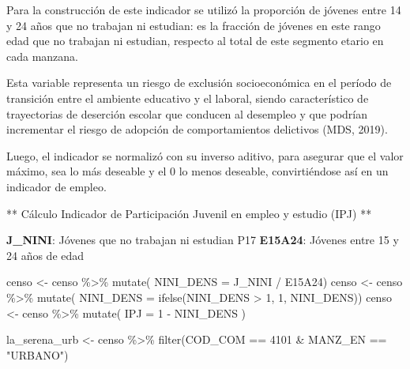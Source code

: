\documentclass[
  letterpaper,
  DIV=11,
  numbers=noendperiod]{scrreprt}
\newenvironment{Shaded}{\begin{snugshade}}{\end{snugshade}}
\newcommand{\AttributeTok}[1]{\textcolor[rgb]{0.40,0.45,0.13}{#1}}
\newcommand{\DecValTok}[1]{\textcolor[rgb]{0.68,0.00,0.00}{#1}}
\newcommand{\FunctionTok}[1]{\textcolor[rgb]{0.28,0.35,0.67}{#1}}
\newcommand{\NormalTok}[1]{\textcolor[rgb]{0.00,0.23,0.31}{#1}}
\newcommand{\OtherTok}[1]{\textcolor[rgb]{0.00,0.23,0.31}{#1}}
\newcommand{\SpecialCharTok}[1]{\textcolor[rgb]{0.37,0.37,0.37}{#1}}
\newcommand{\StringTok}[1]{\textcolor[rgb]{0.13,0.47,0.30}{#1}}
\begin{document}
Para la construcción de este indicador se utilizó la proporción de
jóvenes entre 14 y 24 años que no trabajan ni estudian: es la fracción
de jóvenes en este rango edad que no trabajan ni estudian, respecto al
total de este segmento etario en cada manzana.

Esta variable representa un riesgo de exclusión socioeconómica en el
período de transición entre el ambiente educativo y el laboral, siendo
característico de trayectorias de deserción escolar que conducen al
desempleo y que podrían incrementar el riesgo de adopción de
comportamientos delictivos (MDS, 2019).

Luego, el indicador se normalizó con su inverso aditivo, para asegurar
que el valor máximo, sea lo más deseable y el 0 lo menos deseable,
convirtiéndose así en un indicador de empleo.

** Cálculo Indicador de Participación Juvenil en empleo y estudio (IPJ)
**

\textbf{J\_NINI}: Jóvenes que no trabajan ni estudian P17
\textbf{E15A24}: Jóvenes entre 15 y 24 años de edad

\begin{Shaded}
\begin{Highlighting}[]
\NormalTok{censo }\OtherTok{\textless{}{-}}\NormalTok{ censo }\SpecialCharTok{\%\textgreater{}\%} \FunctionTok{mutate}\NormalTok{( }\AttributeTok{NINI\_DENS =}\NormalTok{ J\_NINI }\SpecialCharTok{/}\NormalTok{ E15A24)  }
\NormalTok{censo }\OtherTok{\textless{}{-}}\NormalTok{ censo }\SpecialCharTok{\%\textgreater{}\%} \FunctionTok{mutate}\NormalTok{( }\AttributeTok{NINI\_DENS =} \FunctionTok{ifelse}\NormalTok{(NINI\_DENS }\SpecialCharTok{\textgreater{}} \DecValTok{1}\NormalTok{, }\DecValTok{1}\NormalTok{, NINI\_DENS))  }
\NormalTok{censo }\OtherTok{\textless{}{-}}\NormalTok{ censo }\SpecialCharTok{\%\textgreater{}\%} \FunctionTok{mutate}\NormalTok{( }\AttributeTok{IPJ =} \DecValTok{1} \SpecialCharTok{{-}}\NormalTok{ NINI\_DENS )}
\end{Highlighting}
\end{Shaded}

\begin{Shaded}
\begin{Highlighting}[]
\NormalTok{la\_serena\_urb }\OtherTok{\textless{}{-}}\NormalTok{ censo }\SpecialCharTok{\%\textgreater{}\%} \FunctionTok{filter}\NormalTok{(COD\_COM }\SpecialCharTok{==} \DecValTok{4101} \SpecialCharTok{\&}\NormalTok{ MANZ\_EN }\SpecialCharTok{==} \StringTok{"URBANO"}\NormalTok{)}
\end{Highlighting}
\end{Shaded}
\end{document}
